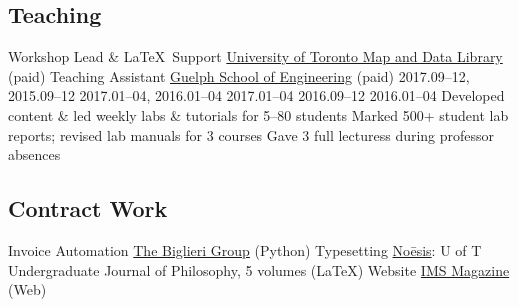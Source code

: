 \subsection{Teaching}
  {Workshop Lead \& \LaTeX\ Support}
  {\href{https://mdl.library.utoronto.ca}{University of Toronto Map and Data Library} (paid)}
  {Teaching Assistant}
  {\href{https://www.uoguelph.ca/engineering}{Guelph School of Engineering} (paid)}
     {2017.09--12, 2015.09--12}
       {2017.01--04, 2016.01--04}
     {2017.01--04}
              {2016.09--12}
   {2016.01--04}
  \bullet Developed content \& led weekly labs \& tutorials for 5--80 students
  \bullet Marked 500+ student lab reports; revised lab manuals for 3 courses
  \bullet Gave 3 full lecturess during professor absences
\subsection{Contract Work}
  {Invoice Automation} %
  {\href{https://www.thebiglierigroup.com}{The Biglieri Group} (Python)}
  {Typesetting} %
  {\href{https://www.noesisjournal.com}{No\={e}sis}: U of T Undergraduate Journal of Philosophy, 5 volumes (\LaTeX)}
  {Website} %
  {\href{https://www.imsmagazine.com}{IMS Magazine} (Web)}
